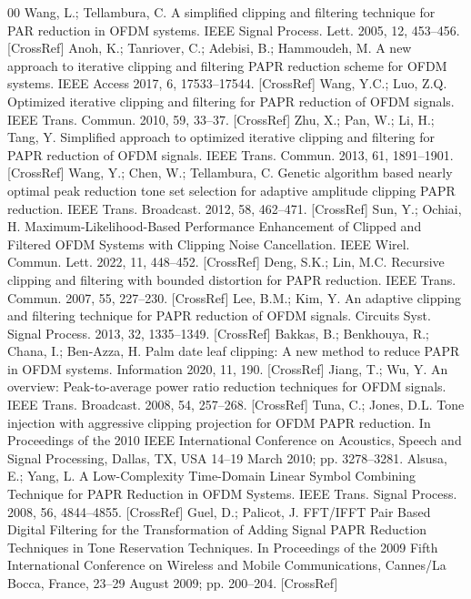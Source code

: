 \documentclass[conference]{IEEEtran}
\begin{document}
\begin{thebibliography}{00}
 Wang, L.; Tellambura, C. A simplified clipping and filtering technique for PAR reduction in OFDM systems. IEEE Signal Process. Lett. 2005, 12, 453–456. [CrossRef]
 Anoh, K.; Tanriover, C.; Adebisi, B.; Hammoudeh, M. A new approach to iterative clipping and filtering PAPR reduction scheme for OFDM systems. IEEE Access 2017, 6, 17533–17544. [CrossRef]
 Wang, Y.C.; Luo, Z.Q. Optimized iterative clipping and filtering for PAPR reduction of OFDM signals. IEEE Trans. Commun. 2010, 59, 33–37. [CrossRef]
 Zhu, X.; Pan, W.; Li, H.; Tang, Y. Simplified approach to optimized iterative clipping and filtering for PAPR reduction of OFDM signals. IEEE Trans. Commun. 2013, 61, 1891–1901. [CrossRef]
 Wang, Y.; Chen, W.; Tellambura, C. Genetic algorithm based nearly optimal peak reduction tone set selection for adaptive amplitude clipping PAPR reduction. IEEE Trans. Broadcast. 2012, 58, 462–471. [CrossRef]
 Sun, Y.; Ochiai, H. Maximum-Likelihood-Based Performance Enhancement of Clipped and Filtered OFDM Systems with Clipping Noise Cancellation. IEEE Wirel. Commun. Lett. 2022, 11, 448–452. [CrossRef]
 Deng, S.K.; Lin, M.C. Recursive clipping and filtering with bounded distortion for PAPR reduction. IEEE Trans. Commun. 2007, 55, 227–230. [CrossRef]
 Lee, B.M.; Kim, Y. An adaptive clipping and filtering technique for PAPR reduction of OFDM signals. Circuits Syst. Signal Process. 2013, 32, 1335–1349. [CrossRef]
 Bakkas, B.; Benkhouya, R.; Chana, I.; Ben-Azza, H. Palm date leaf clipping: A new method to reduce PAPR in OFDM systems. Information 2020, 11, 190. [CrossRef]
 Jiang, T.; Wu, Y. An overview: Peak-to-average power ratio reduction techniques for OFDM signals. IEEE Trans. Broadcast. 2008, 54, 257–268. [CrossRef]
 Tuna, C.; Jones, D.L. Tone injection with aggressive clipping projection for OFDM PAPR reduction. In Proceedings of the 2010 IEEE International Conference on Acoustics, Speech and Signal Processing, Dallas, TX, USA 14–19 March 2010; pp. 3278–3281.
 Alsusa, E.; Yang, L. A Low-Complexity Time-Domain Linear Symbol Combining Technique for PAPR Reduction in OFDM Systems. IEEE Trans. Signal Process. 2008, 56, 4844–4855. [CrossRef]
 Guel, D.; Palicot, J. FFT/IFFT Pair Based Digital Filtering for the Transformation of Adding Signal PAPR Reduction Techniques in Tone Reservation Techniques. In Proceedings of the 2009 Fifth International Conference on Wireless and Mobile Communications, Cannes/La Bocca, France, 23–29 August 2009; pp. 200–204. [CrossRef]

\end{thebibliography}
\end{document}

